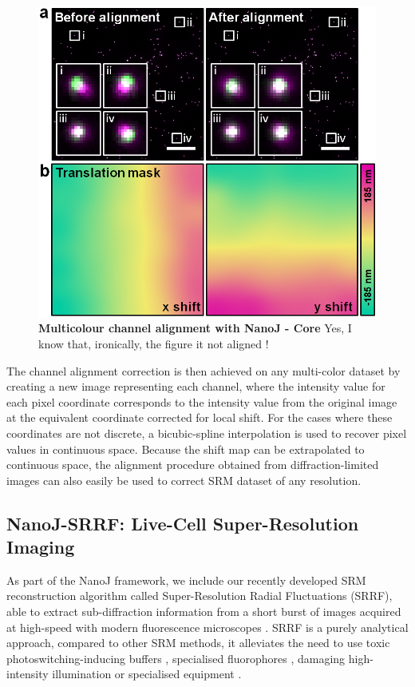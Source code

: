  \begin{figure}[!t]
    \centering
    \includegraphics[width=\linewidth]{Figures/Test_Figure_3.png}
    \caption{\textbf{Multicolour channel alignment with NanoJ - Core} Yes, I know that, ironically, the figure it not aligned !}
    \label{fig:ChannelAlignment}
\end{figure}
 
 The channel alignment correction is then achieved on any multi-color dataset by creating a new image representing each channel, where the intensity value for each pixel coordinate corresponds to the intensity value from the original image at the equivalent coordinate corrected for local shift. For the cases where these coordinates are not discrete, a bicubic-spline interpolation is used to recover pixel values in continuous space. Because the shift map can be extrapolated to continuous space, the alignment procedure obtained from diffraction-limited images can also easily be used to correct SRM dataset of any resolution.

\subsection*{NanoJ-SRRF: Live-Cell Super-Resolution Imaging}
 As part of the NanoJ framework, we include our recently developed SRM reconstruction algorithm called Super-Resolution Radial Fluctuations (SRRF), able to extract sub-diffraction information from a short burst of images acquired at high-speed with modern fluorescence microscopes \cite{gustafsson2016fast,culley2018srrf}. SRRF is a purely analytical approach, compared to other SRM methods, it alleviates the need to use toxic photoswitching-inducing buffers \cite{henriques2011palm}, specialised fluorophores \cite{dempsey2011evaluation,henriques2009palm}, damaging high-intensity illumination \cite{waldchen2015light} or specialised equipment \cite{gustafsson2000surpassing,hell1994breaking}.
 
